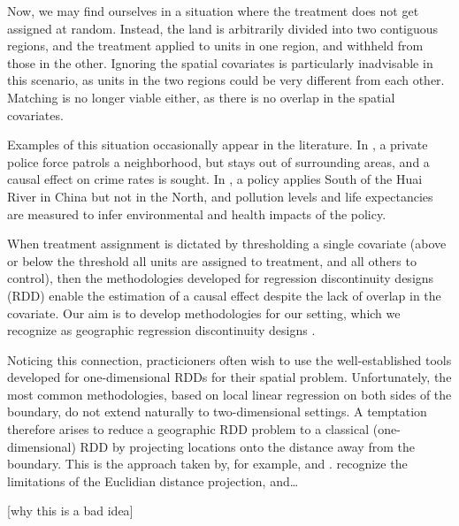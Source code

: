\documentclass[letter]{article}
\renewcommand{\cite}[1]{\citep{#1}}
\begin{document}
Now, we may find ourselves in a situation where the treatment does not get assigned at random.
Instead, the land is arbitrarily divided into two contiguous regions, and the treatment applied to units in one region, and withheld from those in the other.
Ignoring the spatial covariates is particularly inadvisable in this scenario, as units in the two regions could be very different from each other.
Matching is no longer viable either, as there is no overlap in the spatial covariates.

Examples of this situation occasionally appear in the literature. In \cite{macdonald2015effect}, a private police force patrols a neighborhood, but stays out of surrounding areas, and a causal effect on crime rates is sought. In \cite{chen2013evidence}, a policy applies South of the Huai River in China but not in the North, and pollution levels and life expectancies are measured to infer environmental and health impacts of the policy.

When treatment assignment is dictated by thresholding a single covariate (above or below the threshold all units are assigned to treatment, and all others to control), then the methodologies developed for regression discontinuity designs (RDD) enable the estimation of a causal effect despite the lack of overlap in the covariate. Our aim is to develop methodologies for our setting, which we recognize as geographic regression discontinuity designs \cite{keele_titiunik_2015}.

Noticing this connection, practicioners often wish to use the well-established tools developed for one-dimensional RDDs for their spatial problem.
Unfortunately, the most common methodologies, based on local linear regression on both sides of the boundary, do not extend naturally to two-dimensional settings.
A temptation therefore arises to reduce a geographic RDD problem to a classical (one-dimensional) RDD by projecting locations onto the distance away from the boundary.
This is the approach taken by, for example, \cite{macdonald2015effect} and \cite{chen2013evidence}. \cite{keele_titiunik_2015} recognize the limitations of the Euclidian distance projection, and\ldots{}

{[}why this is a bad idea{]}
    
\end{document}
